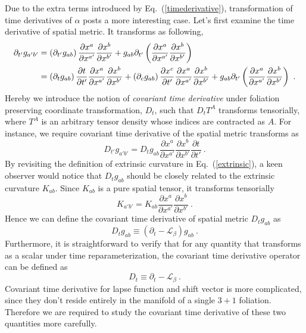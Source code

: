 Due to the extra terms introduced by Eq.~(\ref{timederivative}), transformation of time derivatives of $\alpha$ posts a more interesting case. Let's first examine the time derivative of spatial metric. It transforms as following, 
\begin{align}
\partial_{t'}g_{a'b'} & = \left(\partial_{t'}g_{ab}\right)\frac{\partial x^{a}}{\partial x^{a'}}\frac{\partial x^{b}}{\partial x^{b'}} + g_{ab}\partial_{t'}\left(\frac{\partial x^{a}}{\partial x^{a'}}\frac{\partial x^{b}}{\partial x^{b'}}\right)\notag\\
& =  \left(\partial_{t}g_{ab}\right)\frac{\partial t}{\partial t'}\frac{\partial x^{a}}{\partial x^{a'}}\frac{\partial x^{b}}{\partial x^{b'}} + \left(\partial_{c}g_{ab}\right)\frac{\partial x^{c}}{\partial t'}\frac{\partial x^{a}}{\partial x^{a'}}\frac{\partial x^{b}}{\partial x^{b'}} + g_{ab}\partial_{t'}\left(\frac{\partial x^{a}}{\partial x^{a'}}\frac{\partial x^{b}}{\partial x^{b'}}\right) \ .
\end{align}
Hereby we introduce the notion of {\em covariant time derivative} under foliation preserving coordinate transformation, $D_{t}$, such that $D_{t}T^{A}$ transforms tensorially, where $T^{A}$ is an arbitrary tensor density whose indices are contracted as $A$. For instance, we require covariant time derivative of the spatial metric transforms as
\begin{equation}
	D_{t'}g_{a'b'} = D_{t}g_{ab}\frac{\partial x^{a}}{\partial x^{a'}}\frac{\partial x^{b}}{\partial x^{b'}}\frac{\partial t}{\partial t'} \ .
\end{equation}
By revisiting the definition of extrinsic curvature in Eq.~(\ref{extrinsic}), a keen observer would notice that $D_{t}g_{ab}$ should be closely related to the extrinsic curvature $K_{ab}$. Since $K_{ab}$ is a pure spatial tensor, it transforms tensorially
\begin{equation}
	K_{a'b'} = K_{ab}\frac{\partial x^{a}}{\partial x^{a'}}\frac{\partial x^{b}}{\partial x^{b'}} \ .
\end{equation}
Hence we can define the covariant time derivative of spatial metric $D_{t}g_{ab}$ as
\begin{equation}\label{spatialmetriccovarianttimederivative}
	D_{t}g_{ab} \equiv (\partial_{t} - \mathcal{L}_{\beta})g_{ab} \ .
\end{equation}
Furthermore, it is straightforward to verify that for any quantity that transforms as a scalar under time reparameterization, the covariant time derivative operator can be defined as
\begin{equation}
	D_{t} \equiv \partial_{t} - \mathcal{L}_{\beta} \ .
\end{equation}
Covariant time derivative for lapse function and shift vector is more complicated, since they don't reside entirely in the manifold of a single $3 + 1$ foliation. Therefore we are required to study the covariant time derivative of these two quantities more carefully. 

